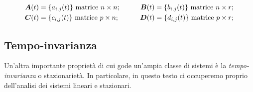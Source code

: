 \documentclass[a4paper]{article}
\renewcommand{\vec}{\bm}
\theoremstyle{definition}
\begin{document}
		\begin{align*}
			\vec{A}(t) &= \{a_{i,j} (t) \} \ \textup{matrice} \ n\times n;\qquad
			&\vec{B}(t) = \{b_{i,j}(t) \} \ \textup{matrice} \ n\times r; \\
			\vec{C}(t) &= \{c_{i,j} (t) \} \ \textup{matrice} \ p\times n;\qquad
			&\vec{D}(t) = \{d_{i,j}(t) \} \ \textup{matrice} \ p\times r; 
		\end{align*}
		
	\subsection{Tempo-invarianza}
		Un’altra importante proprietà di cui gode un'ampia classe di sistemi è la \textit{tempo-invarianza} o stazionarietà. In particolare, in questo testo ci occuperemo proprio dell’analisi dei sistemi
		lineari e stazionari.
		
\end{document}
